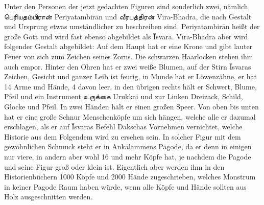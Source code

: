 \documentclass{article}
\newcommand{\TamilText}[1]{\texttamil{#1}}
\newcommand{\tam}[1]{\TamilText{#1}}
\begin{document}
Unter den Personen der jetzt gedachten Figuren sind sonderlich zwei, nämlich \tam{பெரியதம்பிரான்} Periyatambir\={a}n und \tam{வீரபத்திரன்} V\={i}ra-Bhadra, die nach Gestalt und Ursprung etwas umständlicher zu beschreiben sind. Periyatambir\={a}n heißt der große Gott und wird fast ebenso abgebildet als \={I}svara. V\={i}ra-Bhadra aber wird folgender Gestalt abgebildet: Auf dem Haupt hat er eine Krone und gibt lauter Feuer von sich zum Zeichen seines Zorns. Die schwarzen Haarlocken stehen ihm auch empor. Hinter den Ohren hat er zwei weiße Blumen, auf der Stirn \={I}svaras Zeichen, Gesicht und ganzer Leib ist feurig, in Munde hat er Löwenzähne, er hat 14 Arme und Hände, 4 davon leer, in den übrigen rechts hält er Schwert, Blume, Pfeil und ein Instrument \tam{உருக்கை} Urukkai und zur Linken Dreizack, Schild, Glocke und Pfeil. In zwei Händen hält er einen großen Speer. Von oben bis unten hat er eine große Schnur Menschenköpfe um sich hängen, welche alle er dazumal erschlagen, als er auf \={I}svaras Befehl Dakschas Vornehmen vernichtet, welche Historie aus dem Folgendem wird zu ersehen sein. In solcher Figur mit dem gewöhnlichen Schmuck steht er in Ank\={a}lammens Pagode, da er denn in einigen nur viere, in andern aber wohl 16 und mehr Köpfe hat, je nachdem die Pagode und seine Figur groß oder klein ist. Eigentlich aber werden ihm in den Historienbüchern 1000 Köpfe und 2000 Hände zugeschrieben, welches Monstrum in keiner Pagode Raum haben würde, wenn alle Köpfe und Hände sollten aus Holz ausgeschnitten werden.
\end{document}
